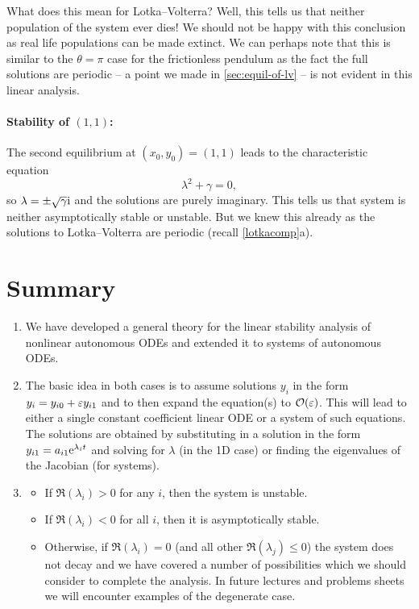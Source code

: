 \documentclass[main.tex]{subfiles}
\begin{document}
What does this mean for Lotka--Volterra? Well, this tells us that neither population of the system ever dies! We should not be happy with this conclusion as real life populations can be made extinct. We can perhaps note that this is similar to the $\theta = \pi$ case for the frictionless pendulum as the fact the full solutions are periodic -- a point we made in \cref{sec:equil-of-lv} -- is not evident in this linear analysis.

\paragraph{Stability of $(1,1)$:} The second equilibrium at $(x_0,y_0) = (1,1)$ leads to the characteristic equation
\begin{equation}
\lambda^2  + \gamma = 0,
\end{equation}
so $\lambda  = \pm \sqrt{\gamma}\mathrm{i} $ and the solutions are purely imaginary. This tells us that system is neither asymptotically stable or unstable. But we knew this already as the solutions to Lotka--Volterra are periodic (recall \cref{lotkacomp}a). 

\section*{Summary}
\begin{enumerate}
\item{We have developed a general theory for the linear stability analysis of nonlinear autonomous ODEs and extended it to systems of autonomous ODEs}. 

\item{The basic idea in both cases is to assume solutions $y_i$ in the form $y_i= y_{i0} + \varepsilon y_{i1}$ and to then expand the equation(s) to $\mathcal{O}(\varepsilon)$. This will lead to either a single constant coefficient linear ODE or a system of such equations. The solutions are obtained by substituting in a solution in the form $y_{i1}=a_{i1}\mathrm{e}^{\lambda_i t}$ and solving for $\lambda$ (in the 1D case) or finding the eigenvalues of the Jacobian (for systems).}

\item{\begin{itemize}
	\item If $\Re(\lambda_i)>0$ for any $i$, then the system is unstable. 
	\item If $\Re(\lambda_i)<0$ for all $i$, then it is asymptotically stable. 
	\item Otherwise, if $\Re(\lambda_i)=0$  (and all other $\Re(\lambda_j)\leq0$) the system does not decay and we have covered a number of possibilities which we should consider to complete the analysis. In future lectures and problems sheets we will encounter examples of the degenerate case.
	\end{itemize}} 
\end{enumerate}
\end{document}
